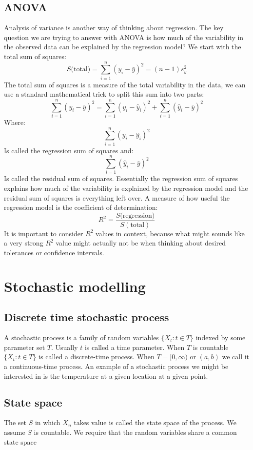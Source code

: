 \documentclass[12pt]{article}
\begin{document}
\subsection*{ANOVA}
Analysis of variance is another way of thinking about regression. The key question we are trying to answer with ANOVA is how much of the variability in the observed data can be explained by the regression model? We start with the total sum of squares:
\[S(\text{total)}=\sum^n_{i=1}(y_i-\bar{y})^2=(n-1)s_y^2\]
The total sum of squares is a measure of the total variability in the data, we can use a standard mathematical trick to split this sum into two parts:
\[\sum^n_{i=1}(y_i-\bar{y})^2=\sum^n_{i=1}(y_i-\hat{y}_i)^2+\sum^n_{i=1}(\hat{y}_i-\bar{y})^2\]
Where:
\[\sum^n_{i=1}(y_i-\hat{y}_i)^2\]
Is called the regression sum of squares and:
\[\sum^n_{i=1}(\hat{y}_i-\bar{y})^2\]
Is called the residual sum of squares. Essentially the regression sum of squares explains how much of the variability is explained by the regression model and the residual sum of squares is everything left over. A measure of how useful the regression model is the coefficient of determination:
\[R^2=\frac{S(\text{regression)}}{S(\text{total})}\]
It is important to consider \(R^2\) values in context, because what might sounds like a very strong \(R^2\) value might actually not be when thinking about desired tolerances or confidence intervals.
\section*{Stochastic modelling}
\subsection*{Discrete time stochastic process}
A stochastic process is a family of random variables \(\{X_t:t\in T\}\) indexed by some parameter set \(T\). Usually \(t\) is called a time parameter. When \(T\) is countable \(\{X_t:t\in T\}\) is called a discrete-time process. When \(T=[0,\infty)\) or \((a,b)\) we call it a continuous-time process. An example of a stochastic process we might be interested in is the temperature at a given location at a given point.
\subsection*{State space}
The set \(S\) in which \(X_n\) takes value is called the state space of the process. We assume \(S\) is countable. We require that the random variables share a common state space
\end{document}
